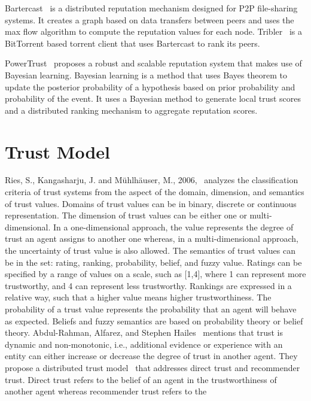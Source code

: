 Bartercast~\cite{meulpolder2009bartercast} is a distributed reputation
mechanism designed for P2P file-sharing systems. It creates a graph based on
data transfers between peers and uses the max flow algorithm to compute the
reputation values for each node. Tribler~\cite{pouwelse2008tribler} is a
BitTorrent based torrent client that uses Bartercast to rank its peers.  

PowerTrust~\cite{zhou2007powertrust} proposes a robust and scalable reputation
system that makes use of Bayesian learning. Bayesian learning is a method that
uses Bayes theorem to update the posterior probability of a hypothesis based on
prior probability and probability of the event. It uses a Bayesian method to
generate local trust scores and a distributed ranking mechanism to aggregate
reputation scores. 

\section{Trust Model}
Ries, S., Kangasharju, J. and Mühlhäuser, M.,
2006,~\cite{ries2006classification} analyzes the classification criteria of
trust systems from the aspect of the domain, dimension, and semantics of trust
values. Domains of trust values can be in binary, discrete or continuous
representation. The dimension of trust values can be either one or
multi-dimensional. In a one-dimensional approach, the value represents the
degree of trust an agent assigns to another one whereas, in a multi-dimensional
approach, the uncertainty of trust value is also allowed. The semantics of
trust values can be in the set: rating, ranking, probability, belief, and fuzzy
value. Ratings can be specified by a range of values on a scale, such as [1,4],
where 1 can represent more trustworthy, and 4 can represent less trustworthy.
Rankings are expressed in a relative way, such that a higher value means higher
trustworthiness. The probability of a trust value represents the probability
that an agent will behave as expected. Beliefs and fuzzy semantics are based on
probability theory or belief theory. Abdul-Rahman, Alfarez, and Stephen
Hailes~\cite{abdul2000supporting} mentions that trust is dynamic and
non-monotonic, i.e., additional evidence or experience with an entity can
either increase or decrease the degree of trust in another agent. They propose
a distributed trust model~\cite{abdul1998distributed} that addresses direct
trust and recommender trust. Direct trust refers to the belief of an agent in
the trustworthiness of another agent whereas recommender trust refers to the
